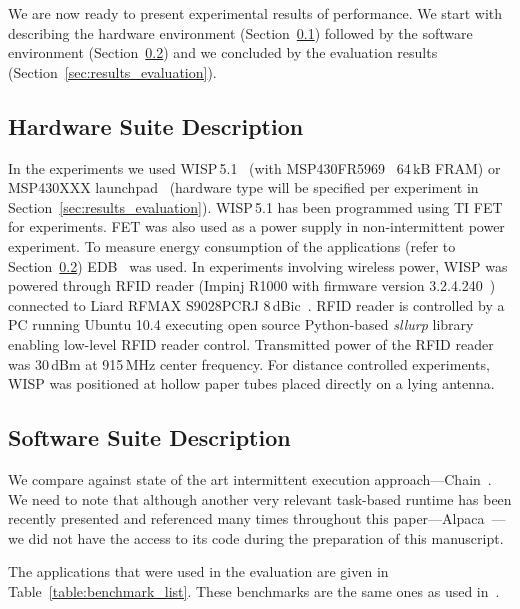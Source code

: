 We are now ready to present experimental results of \sys performance. We start with describing the hardware environment (Section~\ref{sec:results_hardware}) followed by the software environment (Section~\ref{sec:results_software}) and we concluded by the evaluation results (Section~\ref{sec:results_evaluation}).

\subsection{Hardware Suite Description}
\label{sec:results_hardware}

In the experiments we used WISP\,5.1~\cite{wisp5,wisp} (with MSP430FR5969~\cite{wolverine} 64\,kB FRAM) or MSP430XXX launchpad~\cite{} (hardware type will be specified per experiment in Section~\ref{sec:results_evaluation}). WISP\,5.1 has been programmed using TI FET for experiments. FET was also used as a power supply in non-intermittent power experiment. To measure energy consumption of the applications (refer to Section~\ref{sec:results_software}) EDB~\cite{edb} was used. In experiments involving wireless power, WISP was powered through RFID reader (Impinj R1000 with firmware version 3.2.4.240~\cite{r1000_data_sheet}) connected to Liard RFMAX S9028PCRJ 8\,dBic~\cite{atlas2015}. RFID reader is controlled by a PC running Ubuntu 10.4 executing open source Python-based \emph{sllurp} library~\cite{sllrp_github} enabling low-level RFID reader control. Transmitted power of the RFID reader was 30\,dBm at 915\,MHz center frequency. For distance controlled experiments, WISP was positioned at hollow paper tubes placed directly on a lying antenna. 

\subsection{Software Suite Description}
\label{sec:results_software}

We compare \sys against state of the art intermittent execution approach---Chain~\cite{chain}. We need to note that although another very relevant task-based runtime has been recently presented and referenced many times throughout this paper---Alpaca~\cite{alpaca}---we did not have the access to its code during the preparation of this manuscript. 

The applications that were used in the evaluation are given in Table~\ref{table:benchmark_list}. These benchmarks are the same ones as used in~\cite{chain,alpaca}.

